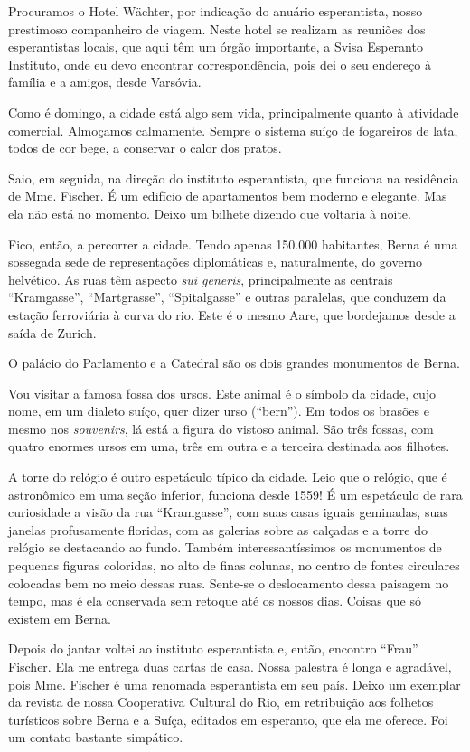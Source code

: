 Procuramos o Hotel Wächter, por indicação do anuário esperantista, nosso prestimoso companheiro de viagem. Neste hotel se realizam as reuniões dos esperantistas locais, que aqui têm um órgão importante, a Svisa Esperanto Instituto, onde eu devo encontrar correspondência, pois dei o seu endereço à família e a amigos, desde Varsóvia.

Como é domingo, a cidade está algo sem vida, principalmente quanto à atividade comercial. Almoçamos calmamente. Sempre o sistema suíço de fogareiros de lata, todos de cor bege, a conservar o calor dos pratos.

Saio, em seguida, na direção do instituto esperantista, que funciona na residência de Mme. Fischer. É um edifício de apartamentos bem moderno e elegante. Mas ela não está no momento. Deixo um bilhete dizendo que voltaria à noite.

Fico, então, a percorrer a cidade. Tendo apenas 150.000 habitantes, Berna é uma sossegada sede de representações diplomáticas e, naturalmente, do governo helvético. As ruas têm aspecto \textit{sui generis}, principalmente as centrais ``Kramgasse'', ``Martgrasse'', ``Spitalgasse'' e outras paralelas, que conduzem da estação ferroviária à curva do rio. Este é o mesmo Aare, que bordejamos desde a saída de Zurich.

O palácio do Parlamento e a Catedral são os dois grandes monumentos de Berna.

Vou visitar a famosa fossa dos ursos. Este animal é o símbolo da cidade, cujo nome, em um dialeto suíço, quer dizer urso (``bern''). Em todos os brasões e mesmo nos \textit{souvenirs}, lá está a figura do vistoso animal. São três fossas, com quatro enormes ursos em uma, três em outra e a terceira destinada aos filhotes.

A torre do relógio é outro espetáculo típico da cidade. Leio que o relógio, que é astronômico em uma seção inferior, funciona desde 1559! É um espetáculo de rara curiosidade a visão da rua ``Kramgasse'', com suas casas iguais geminadas, suas janelas profusamente floridas, com as galerias sobre as calçadas e a torre do relógio se destacando ao fundo. Também interessantíssimos os monumentos de pequenas figuras coloridas, no alto de finas colunas, no centro de fontes circulares colocadas bem no meio dessas ruas. Sente-se o deslocamento dessa paisagem no tempo, mas é ela conservada sem retoque até os nossos dias. Coisas que só existem em Berna.

Depois do jantar voltei ao instituto esperantista e, então, encontro ``Frau'' Fischer. Ela me entrega duas cartas de casa. Nossa palestra é longa e agradável, pois Mme. Fischer é uma renomada esperantista em seu país. Deixo um exemplar da revista de nossa Cooperativa Cultural do Rio, em retribuição aos folhetos turísticos sobre Berna e a Suíça, editados em esperanto, que ela me oferece. Foi um contato bastante simpático.

